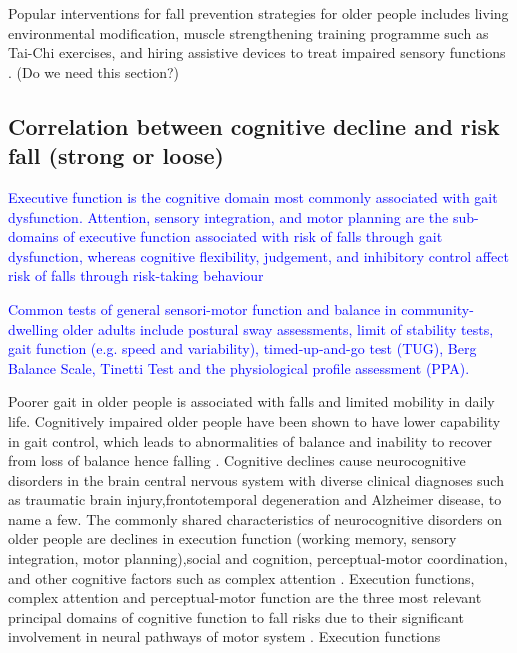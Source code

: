 \documentclass[conference,compsoc]{IEEEtran}
\begin{document}
Popular interventions for fall prevention strategies for older people includes living environmental modification, muscle strengthening training programme such as Tai-Chi exercises, and hiring assistive devices to treat impaired sensory functions \cite{who_2012}. (Do we need this section?)

\subsection{Correlation between cognitive decline and risk fall (strong or loose)}

\textcolor{blue}{Executive function is the cognitive domain most commonly associated with gait dysfunction. Attention, sensory integration, and motor planning
are the sub-domains of executive function associated with risk of falls through gait dysfunction, whereas cognitive flexibility, judgement, and inhibitory control affect risk of falls through risk-taking behaviour\cite{Zhang_2019}}

\textcolor{blue}{Common tests of general sensori-motor function and balance in community-dwelling older adults include postural sway assessments, limit of stability tests, gait function (e.g. speed and variability), timed-up-and-go test (TUG), Berg Balance Scale, Tinetti Test and the physiological profile assessment (PPA). \cite{Carty_2014}}


Poorer gait in older people is associated with falls and limited mobility in daily life. Cognitively impaired older people have been shown to have lower capability in gait control, which leads to abnormalities of balance and inability to recover from loss of balance \cite{Thelen_1997} hence falling \cite{Martin_2012, Carty_2014}. Cognitive declines cause neurocognitive disorders in the brain central nervous system with diverse clinical diagnoses such as traumatic brain injury,frontotemporal degeneration and Alzheimer disease, to name a few. The commonly shared characteristics of neurocognitive disorders on older people are declines in execution function (working memory,  sensory integration, motor planning),social and cognition, perceptual-motor coordination, and other cognitive factors such as complex attention \cite{Sachdev_2014}. Execution functions, complex attention and perceptual-motor function are the three most relevant principal domains of cognitive function to fall risks due to their significant involvement in neural pathways of motor system \cite{Zhang_2019}. Execution functions 
\end{document}
